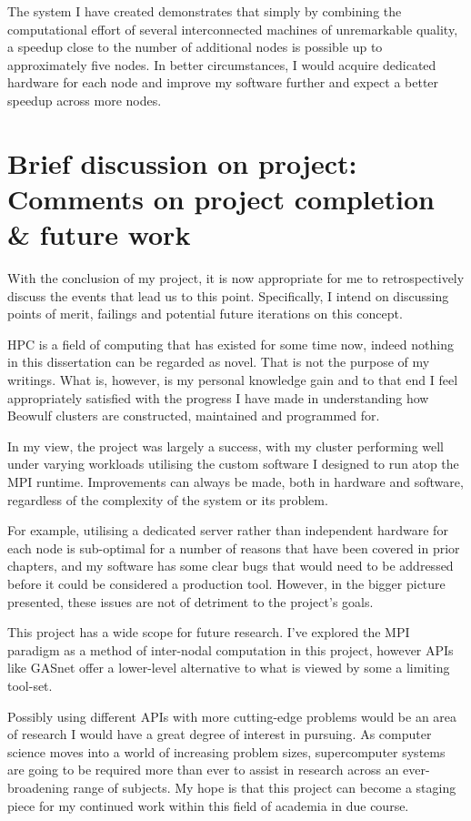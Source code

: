 The system I have created demonstrates that simply by combining the computational effort of several interconnected machines of unremarkable quality, a speedup close to the number of additional nodes is possible up to approximately five nodes. In better circumstances, I would acquire dedicated hardware for each node and improve my software further and expect a better speedup across more nodes.

\section{Brief discussion on project: Comments on project completion \& future work}
With the conclusion of my project, it is now appropriate for me to retrospectively discuss the events that lead us to this point. Specifically, I intend on discussing points of merit, failings and potential future iterations on this concept.

\textbf{}

HPC is a field of computing that has existed for some time now, indeed nothing in this dissertation can be regarded as novel. That is not the purpose of my writings. What is, however, is my personal knowledge gain and to that end I feel appropriately satisfied with the progress I have made in understanding how Beowulf clusters are constructed, maintained and programmed for.

In my view, the project was largely a success, with my cluster performing well under varying workloads utilising the custom software I designed to run atop the MPI runtime. Improvements can always be made, both in hardware and software, regardless of the complexity of the system or its problem.

For example, utilising a dedicated server rather than independent hardware for each node is sub-optimal for a number of reasons that have been covered in prior chapters, and my software has some clear bugs that would need to be addressed before it could be considered a production tool. However, in the bigger picture presented, these issues are not of detriment to the project's goals.

\textbf{}

This project has a wide scope for future research. I've explored the MPI paradigm as a method of inter-nodal computation in this project, however APIs like GASnet \cite{gasnet_team_2020} offer a lower-level alternative to what is viewed by some a limiting tool-set.

Possibly using different APIs with more cutting-edge problems would be an area of research I would have a great degree of interest in pursuing. As computer science moves into a world of increasing problem sizes, supercomputer systems are going to be required more than ever to assist in research across an ever-broadening range of subjects. My hope is that this project can become a staging piece for my continued work within this field of academia in due course.
